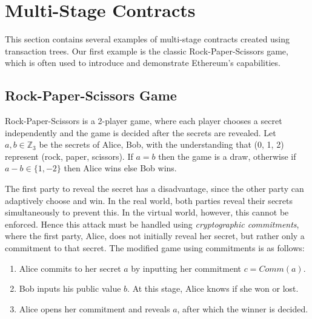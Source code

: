 \documentclass[runningheads]{llncs}
\begin{document}
\section{Multi-Stage Contracts}

This section contains several examples of multi-stage contracts created using transaction trees.
%   
Our first example is the classic Rock-Paper-Scissors game, which is often used to introduce and demonstrate Ethereum's capabilities.

\subsection{Rock-Paper-Scissors Game}
\label{rps}

Rock-Paper-Scissors is a 2-player game, where each player chooses a secret independently and the game is decided after the secrets are revealed. 
Let $a, b\in \mathbb{Z}_3$ be the secrets of Alice, Bob, with the understanding that (0, 1, 2) represent (rock, paper, scissors). If $a = b$ then the game is a draw, otherwise if $a-b \in \{1, -2\}$ then Alice wins else Bob wins. 

The first party to reveal the secret has a disadvantage, since the other party can adaptively choose and win. In the real world, both parties reveal their secrets simultaneously to prevent this. In the virtual world, however, this cannot be enforced. Hence this attack must be handled using {\em cryptographic commitments}, where the first party, Alice, does not initially reveal her secret, but rather only a commitment to that secret. 
The modified game using commitments is as follows:

\begin{enumerate}
	\item Alice commits to her secret $a$ by inputting her commitment $c = Comm(a)$.
	\item Bob inputs his public value $b$. At this stage, Alice knows if she won or lost.
	\item Alice opens her commitment and reveals $a$, after which the winner is decided.
\end{enumerate}
\end{document}
